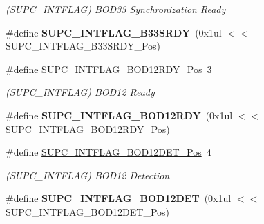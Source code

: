 \begin{DoxyCompactItemize}
\begin{DoxyCompactList}\small\item\em (S\+U\+P\+C\+\_\+\+I\+N\+T\+F\+L\+A\+G) B\+O\+D33 Synchronization Ready \end{DoxyCompactList}\item 
\hypertarget{group___s_a_m_l21___s_u_p_c_ga511f8d67374736e9ec3593da5d715825}{}\#define {\bfseries S\+U\+P\+C\+\_\+\+I\+N\+T\+F\+L\+A\+G\+\_\+\+B33\+S\+R\+D\+Y}~(0x1ul $<$$<$ S\+U\+P\+C\+\_\+\+I\+N\+T\+F\+L\+A\+G\+\_\+\+B33\+S\+R\+D\+Y\+\_\+\+Pos)\label{group___s_a_m_l21___s_u_p_c_ga511f8d67374736e9ec3593da5d715825}

\item 
\hypertarget{group___s_a_m_l21___s_u_p_c_ga4eaf0166f7b6d5e50f7675fd2ebcd57d}{}\#define \hyperlink{group___s_a_m_l21___s_u_p_c_ga4eaf0166f7b6d5e50f7675fd2ebcd57d}{S\+U\+P\+C\+\_\+\+I\+N\+T\+F\+L\+A\+G\+\_\+\+B\+O\+D12\+R\+D\+Y\+\_\+\+Pos}~3\label{group___s_a_m_l21___s_u_p_c_ga4eaf0166f7b6d5e50f7675fd2ebcd57d}

\begin{DoxyCompactList}\small\item\em (S\+U\+P\+C\+\_\+\+I\+N\+T\+F\+L\+A\+G) B\+O\+D12 Ready \end{DoxyCompactList}\item 
\hypertarget{group___s_a_m_l21___s_u_p_c_ga4578d7d2c3f2f37ef7fb26e354ccedeb}{}\#define {\bfseries S\+U\+P\+C\+\_\+\+I\+N\+T\+F\+L\+A\+G\+\_\+\+B\+O\+D12\+R\+D\+Y}~(0x1ul $<$$<$ S\+U\+P\+C\+\_\+\+I\+N\+T\+F\+L\+A\+G\+\_\+\+B\+O\+D12\+R\+D\+Y\+\_\+\+Pos)\label{group___s_a_m_l21___s_u_p_c_ga4578d7d2c3f2f37ef7fb26e354ccedeb}

\item 
\hypertarget{group___s_a_m_l21___s_u_p_c_gadd6560b41000edae603f06ebfba9b21d}{}\#define \hyperlink{group___s_a_m_l21___s_u_p_c_gadd6560b41000edae603f06ebfba9b21d}{S\+U\+P\+C\+\_\+\+I\+N\+T\+F\+L\+A\+G\+\_\+\+B\+O\+D12\+D\+E\+T\+\_\+\+Pos}~4\label{group___s_a_m_l21___s_u_p_c_gadd6560b41000edae603f06ebfba9b21d}

\begin{DoxyCompactList}\small\item\em (S\+U\+P\+C\+\_\+\+I\+N\+T\+F\+L\+A\+G) B\+O\+D12 Detection \end{DoxyCompactList}\item 
\hypertarget{group___s_a_m_l21___s_u_p_c_gaa34249bb21b0b2dbee9d1d85e265d84e}{}\#define {\bfseries S\+U\+P\+C\+\_\+\+I\+N\+T\+F\+L\+A\+G\+\_\+\+B\+O\+D12\+D\+E\+T}~(0x1ul $<$$<$ S\+U\+P\+C\+\_\+\+I\+N\+T\+F\+L\+A\+G\+\_\+\+B\+O\+D12\+D\+E\+T\+\_\+\+Pos)\label{group___s_a_m_l21___s_u_p_c_gaa34249bb21b0b2dbee9d1d85e265d84e}


\end{DoxyCompactItemize}
